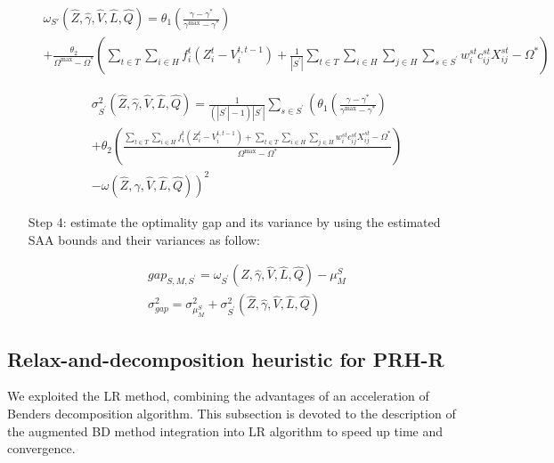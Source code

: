 \documentclass[review]{elsarticle}
\begin{document}
\begin{itemize}
\begin{align}
&\omega_{S'}(\widehat{Z}, \widehat{\gamma }, \widehat{V}, \widehat{L}, \widehat{Q})=\theta_{1} \left(\frac{\gamma -\gamma^{*} }{\gamma^{\max }-\gamma^{*} } \right) \label{eq27}\\
&+\frac{\theta_{2}}{\Omega ^{\max } -\Omega ^{*} }  \left({\sum _{t\in T}\sum _{i\in H}f_{i}^{t} \left(Z_{i}^{t} -V_{i}^{t,t-1} \right)  +\frac{1}{|S^{'} |} \sum _{t\in T}\sum _{i\in H}\sum _{j\in H}
\sum_{s\in S^{'} }w_{i}^{st} c_{ij}^{st} X_{ij}^{st} -\Omega^{*} } \right)\nonumber
\end{align}

\begin{align}\label{eq28}
&\sigma_{S^{'}}^{2} (\widehat{Z},\widehat{\gamma },\widehat{V},\widehat{L},\widehat{Q})=\frac{1}{\left(|S^{'} |-1\right)|S^{'} |} \sum _{s\in S^{'} }\left(\theta _{1} \left(\frac{\gamma -\gamma ^{*} }{\gamma ^{\max } -\gamma ^{*} } \right)\right.\\
&\left. +\theta _{2} \left(\frac{\sum _{t\in T}\sum _{i\in H}f_{i}^{t} \left(Z_{i}^{t} -V_{i}^{t,t-1} \right)  +\sum _{t\in T}\sum _{i\in H}\sum _{j\in H}w_{i}^{st} c_{ij}^{st} X_{ij}^{st}-\Omega ^{*} }{\Omega ^{\max } -\Omega ^{*} } \right)\right.\nonumber\\
&\left.-\omega (\widehat{Z},\widehat{\gamma },\widehat{V},\widehat{L},\widehat{Q})\right)^{2}\nonumber 
\end{align}

\item[Step 4:] estimate the optimality gap and its variance by using the estimated SAA bounds and their variances as follow:

\begin{align}
&gap_{S,M,S^{'}}=\omega _{S^{'} } (\widehat{Z},\widehat{\gamma },\widehat{V},\widehat{L},\widehat{Q})-\mu _{M}^{S} \label{eq29}\\ 
&\sigma _{gap}^{2} =\sigma_{\mu_{M}^{S}}^{2} +\sigma _{S^{'}}^{2} (\widehat{Z},\widehat{\gamma }, \widehat{V}, \widehat{L}, \widehat{Q})\label{eq30}
\end{align}
\end{itemize}

\subsection{Relax-and-decomposition heuristic for PRH-R}

We exploited the LR method, combining the advantages of an acceleration of Benders decomposition algorithm. This subsection is devoted to the description of the augmented BD method integration into LR algorithm to speed up time and convergence. 
\end{document}
